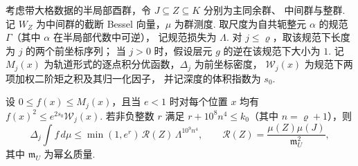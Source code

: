 \begin{lemma}[有限位二进壳层求和]
\label{lem:b-dyadic-shells}
\emitthmsource
考虑带大格数据的半局部酉群，令 $J\subseteq Z\subseteq K$ 分别为主同余群、
中间群与整群. 记 $W_Z$ 为中间群的截断 Bessel 向量，$\mu$ 为群测度.
取尺度为自共轭整元 $\alpha$ 的规范 $\Gamma$（其中 $\alpha$ 在半局部代数中可逆），
记规范损失为 $\Lambda$. 对 $j\le\varrho$，取该规范下长度为 $j$ 的两个前坐标序列；
当 $j>0$ 时，假设层元 $g$ 的逆在该规范下大小为 $1$.
记 $M_j(x)$ 为轨道形式的逐点积分优函数，$\Delta_j$ 为前坐标密度，
$\mathcal W_j(x)$ 为规范下两项加权二阶矩之积及其归一化因子，
并记深度的体积指数为 $s_0$.

设 $0\le f(x)\le M_j(x)$，且当 $e<1$ 时对每个位置 $x$ 均有
$f(x)^2\le e^{2s_0}\mathcal W_j(x)$.
若非负整数 $r$ 满足 $r+10^8 n^4\le k_0$（其中 $n=\varrho+1$），则
\[
 \Delta_j\int f\,d\mu
 \le \min(1,e^r)\,\mathcal R(Z)\,\Lambda^{10^9 n^4},
 \qquad
 \mathcal R(Z)=\frac{\mu(Z)\mu(J)}{\mathfrak m_U^2},
\]
其中 $\mathfrak m_U$ 为幂幺质量.
\end{lemma}
